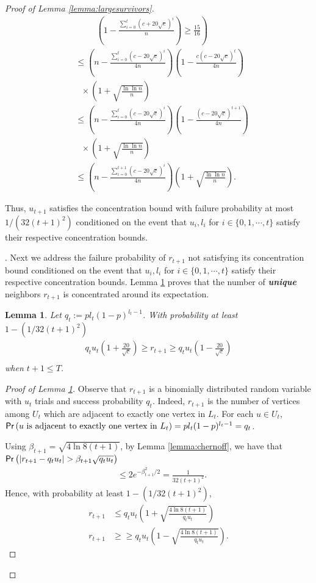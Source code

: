 \documentclass[11pt]{article}
\newtheorem{lemma}[theorem]{Lemma}
\newcommand{\prob}[1]{{\sf Pr}\left(#1\right)}
\begin{document}
\begin{proof}[Proof of Lemma \ref{lemma:largesurvivors}]
\begin{align*}
&\ \ \quad \quad \left.\text{$\left(1-\frac{\sum_{i=0}^t(c+20\sqrt{c})^i}{n}\right)\geq \frac{15}{16}$}\right)\\
&\leq \left(n-\frac{\sum_{i=0}^t(c-20\sqrt{c})^i}{4n}\right)\left(1-\frac{c(c-20\sqrt{c})^t}{4n}\right)\\
&\ \ \ \times \left(1+\sqrt{\frac{\ln{\ln{n}}}{n}}\right)\\
&\leq \left(n-\frac{\sum_{i=0}^t(c-20\sqrt{c})^i}{4n}\right)\left(1-\frac{(c-20\sqrt{c})^{t+1}}{4n}\right)\\
&\ \ \ \times \left(1+\sqrt{\frac{\ln{\ln{n}}}{n}}\right)\\
&\leq \left(n-\frac{\sum_{i=0}^{t+1}(c-20\sqrt{c})^i}{4n}\right)\left(1+\sqrt{\frac{\ln{\ln{n}}}{n}}\right).
\end{align*}

Thus, $u_{t+1}$ satisfies the concentration bound with failure probability at most $1/(32(t+1)^2)$ conditioned on the event that $u_i,l_i$ for $i\in\{0,1,\cdots,t\}$ satisfy their respective concentration bounds.

. Next we address the failure probability of $r_{t+1}$ not satisfying its concentration bound conditioned on the event that $u_i,l_i$ for $i\in\{0,1,\cdots,t\}$ satisfy their respective concentration bounds. Lemma \ref{lemma:lowerbound-R} proves that the number of {\bf \emph{unique}} neighbors $r_{t+1}$ is concentrated around its expectation.

\begin{lemma}\label{lemma:lowerbound-R}
Let $q_t:=pl_t(1-p)^{l_t-1}$. With probability at least $1-(1/32(t+1)^2)$ \begin{align*}
q_tu_t\left(1+\frac{20}{\sqrt{c}}\right) \geq r_{t+1} \geq q_tu_t\left(1-\frac{20}{\sqrt{c}}\right)\\
\end{align*}
when $t+1\leq T$.
\end{lemma}
\begin{proof}[Proof of Lemma \ref{lemma:lowerbound-R}]
Observe that $r_{t+1}$ is a binomially distributed random variable with $u_t$ trials and success probability $q_t$. Indeed, $r_{t+1}$ is the number of vertices among $U_t$ which are adjacent to exactly one vertex in $L_t$. For each $u\in U_t$, $\prob{\text{$u$ is adjacent to exactly one vertex in $L_t$} }=pl_t(1-p)^{l_t-1}=q_t$.

Using $\beta_{t+1}=\sqrt{4\ln{8(t+1)}}$, by Lemma \ref{lemma:chernoff}, we have that
$\prob{|r_{t+1}-q_tu_t|>\beta_{t+1}\sqrt{q_tu_t}}$
\begin{align*}
&\leq 2e^{-\beta_{t+1}^2/2}=\frac{1}{32(t+1)^2}.
\end{align*}
Hence, with probability at least $1-(1/32(t+1)^2)$,
\begin{align}
r_{t+1} &\leq q_tu_t\left(1+\sqrt{\frac{4\ln{8(t+1)}}{q_tu_t}}\right) \label{ineq:r-lowerbound}\\
r_{t+1} &\geq \geq q_tu_t\left(1-\sqrt{\frac{4\ln{8(t+1)}}{q_tu_t}}\right).  \label{ineq:r-upperbound}
\end{align}


\end{proof}
\end{proof}
\end{document}
